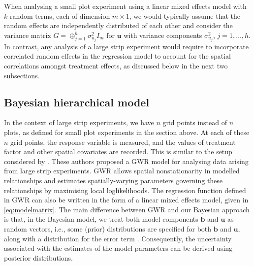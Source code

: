 \documentclass[a4paper]{article}   	%
\begin{document}
	When analysing a small plot experiment using a linear mixed effects model with $k$ random terms, each of dimension $m\times 1$, we would typically assume that the random effects are independently distributed of each other and consider the variance matrix $G=\oplus_{j=1}^h\sigma_{u_j}^2I_m$ for $\bm{u}$ with variance components $\sigma^{2}_{u_j}$, $j=1,\ldots,h$. In contrast, any analysis of a large strip experiment would require to incorporate correlated random effects in the regression model to account for the spatial correlations amongst treatment effects, as discussed below in the next two subsections. 
	
	\subsection{Bayesian hierarchical model}\label{sec:hierarchical}
	
	In the context of large strip experiments, we have $n$ grid points instead of $n$ plots, as defined for small plot experiments in the section above. At each of these $n$ grid points, the response variable is measured, and the values of treatment factor and other spatial covariates are recorded. This is similar to the setup considered by \textcite{Rakshit2020Novel}. These authors proposed a GWR model for analysing data arising from large strip experiments. GWR allows spatial nonstationarity in modelled relationships and estimates spatially-varying parameters governing these relationships by maximising local loglikelihoods. The regression function defined in GWR can also be written in the form of a linear mixed effects model, given in \eqref{eq:modelmatrix}. The main difference between GWR and our Bayesian approach is that, in the Bayesian model, we treat both model components $\bm{b}$ and $\bm{u}$ as random vectors, i.e., some (prior) distributions are specified for both $\bm{b}$ and $\bm{u}$, along with a distribution for the error term \parencite{Burkner2017Brms}. Consequently, the uncertainty associated with the estimates of the model parameters can be derived using posterior distributions. 	
	
\end{document}
